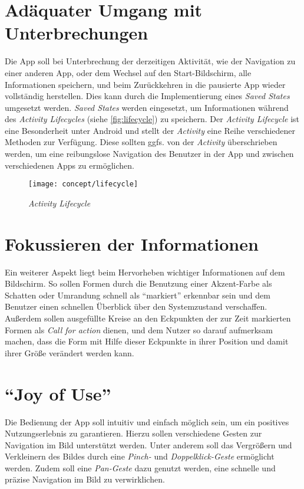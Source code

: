 \section{Adäquater Umgang mit Unterbrechungen}
Die App soll bei Unterbrechung der derzeitigen Aktivität, wie der Navigation zu einer anderen App, oder dem Wechsel auf den Start-Bildschirm, alle Informationen speichern, und beim Zurückkehren in die pausierte App wieder vollständig herstellen.
Dies kann durch die Implementierung eines \emph{Saved States} umgesetzt werden.
\emph{Saved States} werden eingesetzt, um Informationen während des \emph{Activity Lifecycles} (siehe \autoref{fig:lifecycle}) zu speichern.
Der \emph{Activity Lifecycle} ist eine Besonderheit unter Android und stellt der \emph{Activity} eine Reihe verschiedener Methoden zur Verfügung.
Diese sollten ggfs. von der \emph{Activity} überschrieben werden, um eine reibungslose Navigation des Benutzer in der App und zwischen verschiedenen Apps zu ermöglichen.

\begin{figure}[h]
  \centering
  \texttt{[image: concept/lifecycle]}
  \caption{\emph{Activity Lifecycle}}
  \label{fig:lifecycle}
\end{figure}

\section{Fokussieren der Informationen}
Ein weiterer Aspekt liegt beim Hervorheben wichtiger Informationen auf dem Bildschirm.
So sollen Formen durch die Benutzung einer Akzent-Farbe als Schatten oder Umrandung schnell als ``markiert'' erkennbar sein und dem Benutzer einen schnellen Überblick über den Systemzustand verschaffen.
Außerdem sollen ausgefüllte Kreise an den Eckpunkten der zur Zeit markierten Formen als \emph{Call for action} dienen, und dem Nutzer so darauf aufmerksam machen, dass die Form mit Hilfe dieser Eckpunkte in ihrer Position und damit ihrer Größe verändert werden kann.

\section{``Joy of Use''}
Die Bedienung der App soll intuitiv und einfach möglich sein, um ein positives Nutzungserlebnis zu garantieren.
Hierzu sollen verschiedene Gesten zur Navigation im Bild unterstützt werden.
Unter anderem soll das Vergrößern und Verkleinern des Bildes durch eine \emph{Pinch-} und \emph{Doppelklick-Geste} ermöglicht werden.
Zudem soll eine \emph{Pan-Geste} dazu genutzt werden, eine schnelle und präzise Navigation im Bild zu verwirklichen.

